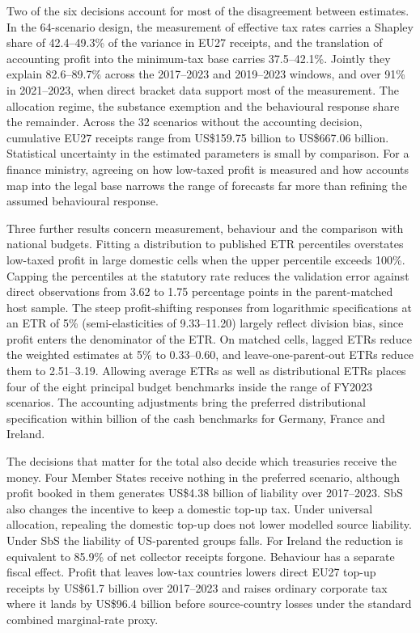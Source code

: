 \documentclass[11pt,a4paper]{article}
\newcommand{\EUR}{\texteuro}
\newcommand{\usd}{US\$}
\begin{document}
Two of the six decisions account for most of the disagreement between estimates. In the 64-scenario design, the measurement of effective tax rates carries a Shapley share of 42.4–49.3\% of the variance in EU27 receipts, and the translation of accounting profit into the minimum-tax base carries 37.5–42.1\%. Jointly they explain 82.6–89.7\% across the 2017–2023 and 2019–2023 windows, and over 91\% in 2021–2023, when direct bracket data support most of the measurement. The allocation regime, the substance exemption and the behavioural response share the remainder. Across the 32 scenarios without the accounting decision, cumulative EU27 receipts range from \usd159.75 billion to \usd667.06 billion. Statistical uncertainty in the estimated parameters is small by comparison. For a finance ministry, agreeing on how low-taxed profit is measured and how accounts map into the legal base narrows the range of forecasts far more than refining the assumed behavioural response.

Three further results concern measurement, behaviour and the comparison with national budgets. Fitting a distribution to published ETR percentiles overstates low-taxed profit in large domestic cells when the upper percentile exceeds 100\%. Capping the percentiles at the statutory rate reduces the validation error against direct observations from 3.62 to 1.75 percentage points in the parent-matched host sample. The steep profit-shifting responses from logarithmic specifications at an ETR of 5\% (semi-elasticities of 9.33–11.20) largely reflect division bias, since profit enters the denominator of the ETR. On matched cells, lagged ETRs reduce the weighted estimates at 5\% to 0.33–0.60, and leave-one-parent-out ETRs reduce them to 2.51–3.19. Allowing average ETRs as well as distributional ETRs places four of the eight principal budget benchmarks inside the range of FY2023 scenarios. The accounting adjustments bring the preferred distributional specification within \EUR0.5 billion of the cash benchmarks for Germany, France and Ireland.

The decisions that matter for the total also decide which treasuries receive the money. Four Member States receive nothing in the preferred scenario, although profit booked in them generates \usd4.38 billion of liability over 2017–2023. SbS also changes the incentive to keep a domestic top-up tax. Under universal allocation, repealing the domestic top-up does not lower modelled source liability. Under SbS the liability of US-parented groups falls. For Ireland the reduction is equivalent to 85.9\% of net collector receipts forgone. Behaviour has a separate fiscal effect. Profit that leaves low-tax countries lowers direct EU27 top-up receipts by \usd61.7 billion over 2017–2023 and raises ordinary corporate tax where it lands by \usd96.4 billion before source-country losses under the standard combined marginal-rate proxy.
\end{document}
